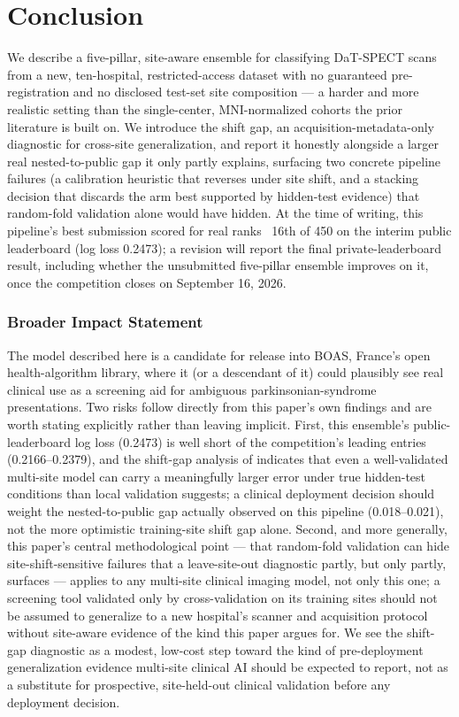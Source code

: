 \documentclass[10pt]{article}
\begin{document}
\section{Conclusion}
\label{sec:conclusion}

We describe a five-pillar, site-aware ensemble for classifying DaT-SPECT scans from a new, ten-hospital, restricted-access dataset with no guaranteed pre-registration and no disclosed test-set site composition --- a harder and more realistic setting than the single-center, MNI-normalized cohorts the prior literature is built on. We introduce the shift gap, an acquisition-metadata-only diagnostic for cross-site generalization, and report it honestly alongside a larger real nested-to-public gap it only partly explains, surfacing two concrete pipeline failures (a calibration heuristic that reverses under site shift, and a stacking decision that discards the arm best supported by hidden-test evidence) that random-fold validation alone would have hidden. At the time of writing, this pipeline's best submission scored for real ranks ~16th of 450 on the interim public leaderboard (log loss 0.2473); a revision will report the final private-leaderboard result, including whether the unsubmitted five-pillar ensemble improves on it, once the competition closes on September 16, 2026.

\subsubsection*{Broader Impact Statement}

The model described here is a candidate for release into BOAS, France's open health-algorithm library, where it (or a descendant of it) could plausibly see real clinical use as a screening aid for ambiguous parkinsonian-syndrome presentations. Two risks follow directly from this paper's own findings and are worth stating explicitly rather than leaving implicit. First, this ensemble's public-leaderboard log loss (0.2473) is well short of the competition's leading entries (0.2166--0.2379), and the shift-gap analysis of  indicates that even a well-validated multi-site model can carry a meaningfully larger error under true hidden-test conditions than local validation suggests; a clinical deployment decision should weight the nested-to-public gap actually observed on this pipeline (0.018--0.021), not the more optimistic training-site shift gap alone. Second, and more generally, this paper's central methodological point --- that random-fold validation can hide site-shift-sensitive failures that a leave-site-out diagnostic partly, but only partly, surfaces --- applies to any multi-site clinical imaging model, not only this one; a screening tool validated only by cross-validation on its training sites should not be assumed to generalize to a new hospital's scanner and acquisition protocol without site-aware evidence of the kind this paper argues for. We see the shift-gap diagnostic as a modest, low-cost step toward the kind of pre-deployment generalization evidence multi-site clinical AI should be expected to report, not as a substitute for prospective, site-held-out clinical validation before any deployment decision.
\end{document}
